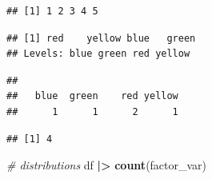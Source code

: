 \documentclass[
  12pt,
  oneside]{book}
\newenvironment{Shaded}{\begin{snugshade}}{\end{snugshade}}
\newcommand{\CommentTok}[1]{\textcolor[rgb]{0.56,0.35,0.01}{\textit{#1}}}
\newcommand{\FunctionTok}[1]{\textcolor[rgb]{0.13,0.29,0.53}{\textbf{#1}}}
\newcommand{\NormalTok}[1]{#1}
\newcommand{\SpecialCharTok}[1]{\textcolor[rgb]{0.81,0.36,0.00}{\textbf{#1}}}
\begin{document}
\begin{Shaded}
\end{Shaded}

\begin{verbatim}
## [1] 1 2 3 4 5
\end{verbatim}

\begin{Shaded}
\end{Shaded}

\begin{verbatim}
## [1] red    yellow blue   green 
## Levels: blue green red yellow
\end{verbatim}

\begin{Shaded}
\end{Shaded}

\begin{verbatim}
## 
##   blue  green    red yellow 
##      1      1      2      1
\end{verbatim}

\begin{Shaded}
\end{Shaded}

\begin{verbatim}
## [1] 4
\end{verbatim}

\begin{Shaded}
\begin{Highlighting}[]
\CommentTok{\# distributions}
\NormalTok{df }\SpecialCharTok{|\textgreater{}} \FunctionTok{count}\NormalTok{(factor\_var)}
\end{Highlighting}
\end{Shaded}
\end{document}
